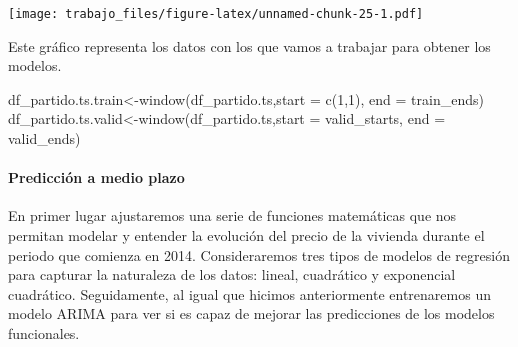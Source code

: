 \documentclass[
]{article}
\newenvironment{Shaded}{\begin{snugshade}}{\end{snugshade}}
\newcommand{\AttributeTok}[1]{\textcolor[rgb]{0.77,0.63,0.00}{#1}}
\newcommand{\DecValTok}[1]{\textcolor[rgb]{0.00,0.00,0.81}{#1}}
\newcommand{\FunctionTok}[1]{\textcolor[rgb]{0.00,0.00,0.00}{#1}}
\newcommand{\NormalTok}[1]{#1}
\newcommand{\OtherTok}[1]{\textcolor[rgb]{0.56,0.35,0.01}{#1}}
\newcommand{\SpecialCharTok}[1]{\textcolor[rgb]{0.00,0.00,0.00}{#1}}
\begin{document}
\begin{Shaded}
\end{Shaded}

\texttt{[image: trabajo\_files/figure-latex/unnamed-chunk-25-1.pdf]}

Este gráfico representa los datos con los que vamos a trabajar para
obtener los modelos.

\begin{Shaded}
\begin{Highlighting}[]
\NormalTok{df\_partido.ts.train}\OtherTok{\textless{}{-}}\FunctionTok{window}\NormalTok{(df\_partido.ts,}\AttributeTok{start =} \FunctionTok{c}\NormalTok{(}\DecValTok{1}\NormalTok{,}\DecValTok{1}\NormalTok{), }\AttributeTok{end =}\NormalTok{ train\_ends)}
\NormalTok{df\_partido.ts.valid}\OtherTok{\textless{}{-}}\FunctionTok{window}\NormalTok{(df\_partido.ts,}\AttributeTok{start =}\NormalTok{ valid\_starts, }\AttributeTok{end =}\NormalTok{ valid\_ends)}
\end{Highlighting}
\end{Shaded}

\hypertarget{predicciuxf3n-a-medio-plazo-1}{%
\paragraph{Predicción a medio
plazo}\label{predicciuxf3n-a-medio-plazo-1}}

En primer lugar ajustaremos una serie de funciones matemáticas que nos
permitan modelar y entender la evolución del precio de la vivienda
durante el periodo que comienza en 2014. Consideraremos tres tipos de
modelos de regresión para capturar la naturaleza de los datos: lineal,
cuadrático y exponencial cuadrático. Seguidamente, al igual que hicimos
anteriormente entrenaremos un modelo ARIMA para ver si es capaz de
mejorar las predicciones de los modelos funcionales.
\end{document}
